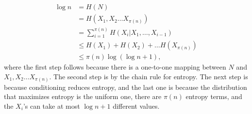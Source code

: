 \documentclass[12pt]{article}
\begin{document}
\begin{enumerate}
\begin{solution}
\begin{enumerate}
\begin{align}
\log n &= H(N) \\
&= H(X_1, X_2 \ldots X_{\pi(n)}) \\
&= \sum_{i=1}^{\pi(n)} H(X_i|X_1, \ldots, X_{i-1})\\
&\leq H(X_1) + H(X_2) + \ldots H(X_{\pi(n)}) \\
&\leq \pi(n) \log( \log n + 1),
\end{align}
where the first step follows because there is a one-to-one mapping between $N$ and $X_1, X_2 \ldots X_{\pi(n)}$. The second step is by the chain rule for entropy. The next step is because conditioning reduces entropy, and the last one is because the distribution that maximizes entropy is the uniform one, there are $\pi(n)$ entropy terms, and the $X_i$'s can take at most $\log n + 1$ different values.

\end{enumerate}

\end{solution}

\begin{problem}
\end{problem}


\end{enumerate}
\end{document}
